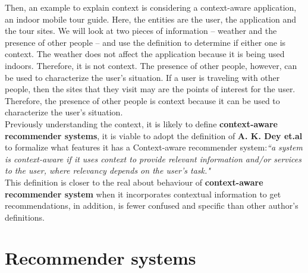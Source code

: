 Then, an example to explain context is considering a context-aware
application, an indoor mobile tour guide. Here, the
entities are the user, the application and the tour sites.  We will
look at two pieces of information – weather and the presence of other
people – and use the definition to determine if either one is context.
The weather does not affect the application because it is being used
indoors. Therefore, it is not context. The presence of other people,
however, can be used to characterize the user’s situation. If a user
is traveling with other people, then the sites that they visit may are
the points of interest for the user. Therefore, the presence of other
people is context because it can be used to characterize the user’s
situation. \\ 
Previously understanding the context, it is likely to define \textbf
{context-aware recommender systems}, it is viable to adopt the
definition of \textbf{A. K. Dey et.al}\cite{dey2001understanding} to
formalize what features it has a Context-aware recommender
system:\textit{``a system is context-aware if it uses context to
provide relevant information and/or services  to the user, where
relevancy depends on the user’s task."} \\  This definition is closer
to the real about behaviour of \textbf{context-aware recommender
system} when it incorporates contextual information to get
recommendations,  in addition, is fewer confused and specific than
other author's definitions.

\section{Recommender systems}

